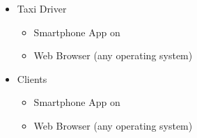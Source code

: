 \documentclass[a4paper]{article}
\begin{document}
\begin{itemize}
\item Taxi Driver
    \begin{itemize}
    \item Smartphone App on
    \item Web Browser (any operating system)
    \end{itemize}
\item Clients
    \begin{itemize}
    \item Smartphone App on
    \item Web Browser (any operating system)
    \end{itemize}
\end{itemize}
\end{document}
